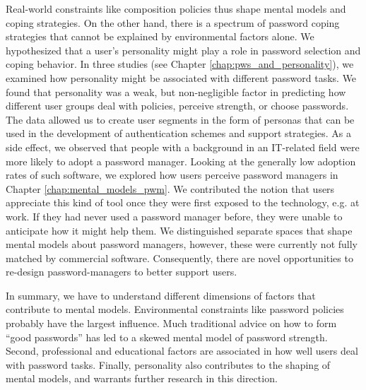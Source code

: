 Real-world constraints like composition policies thus shape mental models and coping strategies. On the other hand, there is a spectrum of password coping strategies that cannot be explained by environmental factors alone. We hypothesized that a user's personality might play a role in password selection and coping behavior. In three studies (see Chapter \ref{chap:pws_and_personality}), we examined how personality might be associated with different password tasks. We found that personality was a weak, but non-negligible factor in predicting how different user groups deal with policies, perceive strength, or choose passwords. The data allowed us to create user segments in the form of personas that can be used in the development of authentication schemes and support strategies. 
As a side effect, we observed that people with a background in an IT-related field were more likely to adopt a password manager. Looking at the generally low adoption rates of such software, we explored how users perceive password managers in Chapter \ref{chap:mental_models_pwm}. We contributed the notion that users appreciate this kind of tool once they were first exposed to the technology, e.g. at work. If they had never used a password manager before, they were unable to anticipate how it might help them. We distinguished separate spaces that shape mental models about password managers, however, these were currently not fully matched by commercial software. Consequently, there are novel opportunities to re-design password-managers to better support users. 

In summary, we have to understand different dimensions of factors that contribute to mental models. Environmental constraints like password policies probably have the largest influence. Much traditional advice on how to form ``good passwords'' has led to a skewed mental model of password strength. Second, professional and educational factors are associated in how well users deal with password tasks. Finally, personality also contributes to the shaping of mental models, and warrants further research in this direction. %

